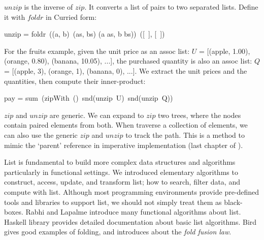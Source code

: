 \documentclass[b5paper]{article}
\begin{document}
$unzip$ is the inverse of $zip$. It converts a list of pairs to two separated lists. Define it with $foldr$ in Curried form:

\be
unzip = foldr\ ((a, b)\ (as, bs) \mapsto (a \cons as, b \cons bs))\ ([\ ], [\ ])
\ee

For the fruits example, given the unit price as an assoc list: $U$ = [(apple, 1.00), (orange, 0.80), (banana, 10.05), ...], the purchased quantity is also an assoc list: $Q$ = [(apple, 3), (orange, 1), (banana, 0), ...]. We extract the unit prices and the quantities, then compute their inner-product:

\be
pay = sum\ (zipWith\ (\cdot)\ snd(unzip\ U)\ snd(unzip\ Q))
\ee

$zip$ and $unzip$ are generic. We can expand to $zip$ two trees, where the nodes contain paired elements from both. When traverse a collection of elements, we can also use the generic $zip$ and $unzip$ to track the path. This is a method to mimic the `parent' reference in imperative implementation (last chapter of \cite{learn-haskell}).

List is fundamental to build more complex data structures and algorithms particularly in functional settings. We introduced elementary algorithms to construct, access, update, and transform list; how to search, filter data, and compute with list. Although most programming environments provide pre-defined tools and libraries to support list, we should not simply treat them as black-boxes. Rabhi and Lapalme introduce many functional algorithms about list\cite{algo-fp}. Haskell library provides detailed documentation about basic list algorithms. Bird gives good examples of folding\cite{fp-pearls}, and introduces about the {\em fold fusion law}.
\end{document}
